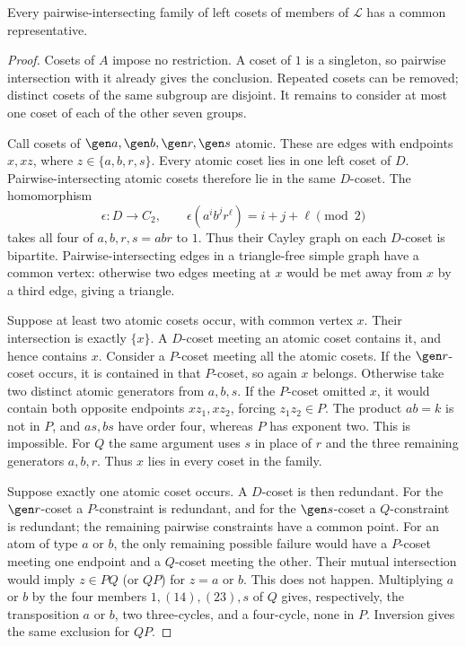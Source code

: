 \begin{lemma}\label{N-lem:helly}
Every pairwise-intersecting family of left cosets of members of
$\mathcal L$ has a common representative.
\end{lemma}
\begin{proof}
Cosets of $A$ impose no restriction. A coset of $1$ is a singleton, so
pairwise intersection with it already gives the conclusion. Repeated
cosets can be removed; distinct cosets of the same subgroup are disjoint.
It remains to consider at most one coset of each of the other seven groups.

Call cosets of $\gen a,\gen b,\gen r,\gen s$ atomic. These are edges
with endpoints $x,xz$, where $z\in\{a,b,r,s\}$. Every atomic coset lies
in one left coset of $D$. Pairwise-intersecting atomic cosets therefore
lie in the same $D$-coset. The homomorphism
\[
 \epsilon:D\longrightarrow C_2,\qquad
 \epsilon(a^i b^j r^\ell)=i+j+\ell\pmod2
\]
takes all four of $a,b,r,s=abr$ to $1$. Thus their Cayley graph on each
$D$-coset is bipartite. Pairwise-intersecting edges in a triangle-free
simple graph have a common vertex: otherwise two edges meeting at $x$
would be met away from $x$ by a third edge, giving a triangle.

Suppose at least two atomic cosets occur, with common vertex $x$.
Their intersection is exactly $\{x\}$. A $D$-coset meeting an atomic
coset contains it, and hence contains $x$. Consider a $P$-coset meeting
all the atomic cosets. If the $\gen r$-coset occurs, it is contained in
that $P$-coset, so again $x$ belongs. Otherwise take two distinct atomic
generators from $a,b,s$. If the $P$-coset omitted $x$, it would contain
both opposite endpoints $xz_1,xz_2$, forcing $z_1z_2\in P$.
The product $ab=k$ is not in $P$, and $as,bs$ have order four, whereas
$P$ has exponent two. This is impossible. For $Q$ the same argument
uses $s$ in place of $r$ and the three remaining generators $a,b,r$.
Thus $x$ lies in every coset in the family.

Suppose exactly one atomic coset occurs. A $D$-coset is then redundant.
For the $\gen r$-coset a $P$-constraint is redundant, and for the
$\gen s$-coset a $Q$-constraint is redundant; the remaining pairwise
constraints have a common point. For an atom of type $a$ or $b$, the only
remaining possible failure would have a $P$-coset meeting one endpoint
and a $Q$-coset meeting the other. Their mutual intersection would imply
$z\in PQ$ (or $QP$) for $z=a$ or $b$. This does not happen. Multiplying
$a$ or $b$ by the four members $1,(14),(23),s$ of $Q$ gives, respectively,
the transposition $a$ or $b$, two three-cycles, and a four-cycle, none in
$P$. Inversion gives the same exclusion for $QP$.


\end{proof}
